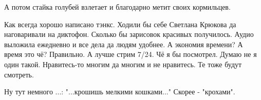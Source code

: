\begin{itemize}
А потом стайка голубей взлетает и благодарно метит своих кормильцев.


Как всегда хорошо написано тэнкс. Ходили бы себе Светлана Крюкова да
наговаривали на диктофон. Сколько бы зарисовок красивых получилось. Аудио
выложила ежедневно и все дела да людям удобнее. А экономия времени? А время это
чё? Правильно. А лучше стрим 7/24. Чё я бы посмотрел. Думаю не я один такой.
Нравитесь-то многим да многим и не нравитесь. Те тоже будут смотреть.


Ну тут немного ...: "...крошишь мелкими кошками..." Скорее - "крохами".

\end{itemize} %
